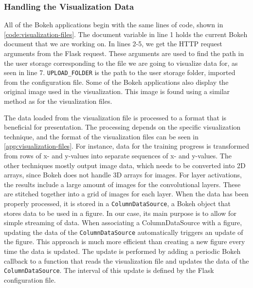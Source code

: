 \subsubsection{Handling the Visualization Data}

All of the Bokeh applications begin with the same lines of code, shown in \autoref{code:visualization-files}. The document variable in line 1 holds the current Bokeh document that we are working on. In lines 2-5, we get the HTTP request arguments from the Flask request. These arguments are used to find the path in the user storage corresponding to the file we are going to visualize data for, as seen in line 7. \texttt{UPLOAD\_FOLDER} is the path to the user storage folder, imported from the configuration file. Some of the Bokeh applications also display the original image used in the visualization. This image is found using a similar method as for the visualization files. \\


\noindent The data loaded from the visualization file is processed to a format that is beneficial for presentation. The processing depends on the specific visualization technique, and the format of the visualization files can be seen in \autoref{app:visualization-files}. For instance, data for the training progress is transformed from rows of x- and y-values into separate sequences of x- and y-values. The other techniques mostly output image data, which needs to be converted into 2D arrays, since Bokeh does not handle 3D arrays for images. For layer activations, the results include a large amount of images for the convolutional layers. These are stitched together into a grid of images for each layer. When the data has been properly processed, it is stored in a \texttt{ColumnDataSource}, a Bokeh object that stores data to be used in a figure. In our case, its main purpose is to allow for simple streaming of data. When associating a ColumnDataSource with a figure, updating the data of the \texttt{ColumnDataSource} automatically triggers an update of the figure. This approach is much more efficient than creating a new figure every time the data is updated. The update is performed by adding a periodic Bokeh callback to a function that reads the visualization file and updates the data of the \texttt{ColumnDataSource}. The interval of this update is defined by the Flask configuration file.

